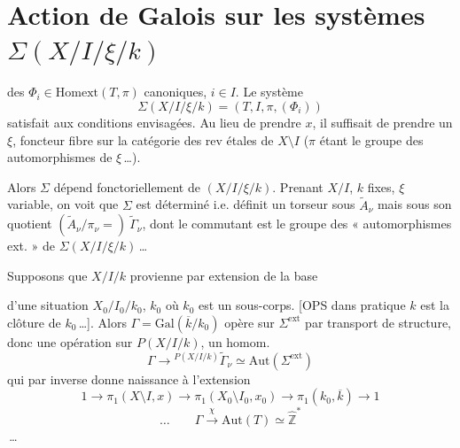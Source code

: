\documentclass[11pt,a4paper]{article}
\begin{document}
\section{Action de Galois sur les systèmes $\Sigma(X/I/\xi/k)$}

des $\Phi_{i} \in \mathrm{Homext}(T, \pi)$ canoniques, $i \in I$. Le
système
\[
  \Sigma(X/I/\xi/k) = (T, I, \pi, (\Phi_{i}))
\]
satisfait aux conditions envisagées. \struck{\ill{}} Au lieu \struck{\ill{}}
de prendre $x$, il suffisait de prendre un $\xi$, foncteur fibre sur la
catégorie des rev étales de $X \setminus I$ ($\pi$ étant
le groupe des automorphismes de $\xi$\,…).

Alors $\Sigma$ dépend fonctoriellement de $(X/I/\xi/k)$. Prenant $X/I$, $k$
fixes, $\xi$ variable, on voit que $\Sigma$ est déterminé
 i.e. \struck{\ill{}} définit un
torseur    sous
$\widetilde{A}_{\nu}$ mais sous son quotient
$(\widetilde{A}_{\nu}/\pi_{\nu} =)\ \widetilde{\Gamma}_{\nu}$,
  dont le commutant est
le groupe des « automorphismes ext. » de 
$\Sigma(X/I/\xi/k)$\,…

Supposons que $X/I/k$ provienne par extension de la base
  

 d'une situation $X_{0}/I_{0}/k_{0}$, $k_{0}$ où
$k_{0}$ est un sous-corps. [OPS dans  pratique $k$ est la
clôture  de $k_{0}$\,…]. Alors
$\Gamma = \mathrm{Gal}(\overline{k}/k_{0})$ opère sur $\Sigma^{\mathrm{ext}}$
par transport de structure, donc  une \struck{\ill{}}
opération  sur $P(X/I/k)$,
  un homom.
\[
  \Gamma \longrightarrow {}^{P(X/I/k)}\widetilde{\Gamma}_{\nu}
  \simeq \mathrm{Aut}(\Sigma^{\mathrm{ext}})
\]
qui par  inverse  donne naissance à
l'extension
\[
  1 \to \pi_{1}(X \setminus I, x) \to \pi_{1}(X_{0} \setminus I_{0}, x_{0})
  \to \pi_{1}(k_{0}, \overline{k}) \to 1
\]
\[
  \dots\qquad \Gamma \xrightarrow{\ \chi\ } \mathrm{Aut}(T)
  \simeq \widehat{\mathbb{Z}}^{*}
\]
\,…
\end{document}
